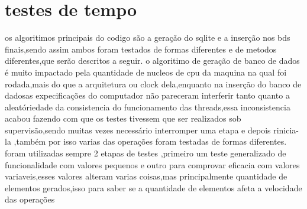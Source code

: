 \documentclass[
	12pt,				%
	openright,			%
	oneside,			%
	a4paper,			%
	english,			%
	french,				%
	spanish,			%
	brazil,				%
	]{abntex2}
\begin{document}
\section{testes de tempo}
\label{sec:testes de tempo}
os algoritimos principais do codigo são a geração do sqlite e a inserção nos bds finais,sendo assim ambos foram testados de formas diferentes e de metodos diferentes,que serão descritos a seguir.
o algoritimo de geração de banco de dados é muito impactado pela quantidade de nucleos de cpu da maquina na qual foi rodada,mais do que a arquitetura ou clock dela,enquanto na inserção do banco de dadosas expecificações do computador não pareceram interferir tanto quanto a aleatóriedade da consistencia do funcionamento das threads,essa inconsistencia acabou fazendo com que os testes tivessem que ser realizados sob supervisão,sendo muitas vezes necessário interromper uma etapa e depois rinicia-la ,também por isso varias das operações foram testadas de formas diferentes.
foram utilizadas sempre 2 etapas de testes ,primeiro um teste generalizado de funcionalidade com valores pequenos e outro para comprovar eficacia com valores variaveis,esses valores alteram varias coisas,mas principalmente quantidade de elementos gerados,isso para saber se a quantidade de elementos afeta a velocidade das operações
\end{document}
